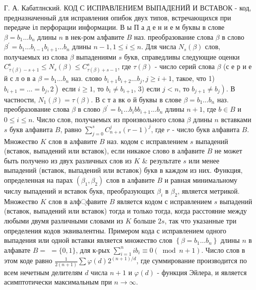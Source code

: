 \documentclass[10pt]{article}
\begin{document}
Г. А. Кабатлнский. КОД С ИСПРАВЛЕНИЕМ ВЫПАДЕНИЙ И ВСТАВОК - код, предназначенный для исправления опибок двух типов, встречающихся при передаче іл перфорации информации. В ы П а д е н и е м буквы в слове $\beta=b_{1} \ldots b_{n}$ длины $n$ в нек-ром алфавите $B$ наз. преобразование слова $\beta$ в слово $\beta^{\prime}=b_{1} \ldots b_{i-1} b_{i+1} \ldots b_{n}$ длины $n-1,1 \leqslant i \leqslant n$. Для числа $N_{s}(\beta)$ слов, получаемых из слова $\beta$ выпадениями $s$ букв, справедливы следующие оценки $C_{\tau(\beta)-s+1}^{\mathrm{s}} \leqslant N_{s}(\beta) \leqslant C_{\tau(\beta)+s-1}^{s}$, где $\tau(\beta)$ - число серий слова $\beta$ (с е р и е й с л о в а $\beta=b_{1} \ldots b_{n}$ наз. слово $b_{i+1} b_{i+2} \ldots b_{j}, j \geqslant i+1$, такое, что 1) $\left.b_{i+1}=\ldots=b_{j}, 2\right)$ если $i \geqslant 1$, то $b_{i} \neq b_{i+1}$, 3) если $j<n$, то $\left.b_{j+1} \neq b_{j}\right)$. В частности, $N_{1}(\beta)=\tau(\beta)$. В с т а вк о й буквы в слове $\beta=b_{1} \ldots b_{n}$ наз. преобразование слова $\beta$ в слово $\beta^{\prime}=b_{1} \ldots b_{i} b b_{i+1} \ldots b_{n}$ длины $n+1$, где $b \in B$ и $0 \leqslant i \leqslant n$. Число слов, получаемых из произвольного слова $\beta$ длины $n$ вставками $s$ букв алфавита $B$, равно $\sum_{j=0}^{s} C_{n+s}^{j}(r-1)^{j}$, где $r$ - число букв алфавита $B$. Множество $K$ слов в алфавите $B$ наз. кодом с исправлением $s$ выпадений (вставок, выпадений или вставок), если никакое слово в алфавите $B$ не может быть получено из двух различных слов из $K$ \& результате $s$ или менее выпадений (вставок, выпадений или вставок) букв в каждом из них. Функция, определенная на парах $\left(\beta_{1}, \beta_{2}\right)$ слов в алфавите $B$ и равная минимальному числу выпадений и вставок букв, преобразующих $\beta_{i}$ в $\beta_{2}$, является метрикой. Множество $K$ слов в алф্фавите $B$ является кодом с исправлением $s$ выпадений (вставок, выпадений или вставок) тогда и только тогда, когда расстояние между любыми двумя различными словами из $K$ больше $2 s$, так что указанные три определения кодов эквивалентны. Примером кода с исправлением одного выпадения или одной вставки является множество слов $\left\{\beta=b_{1} \ldots b_{n}\right\}$ длины $n$ в алфавате $B=$ $=\{0,1\}$, для к-рых $\sum_{i=1}^{n} i b_{i} \equiv 0(\bmod n+1)$. Число слов в этом коде равно $\frac{1}{2(n+1)} \sum \varphi(d) 2^{(n+1) / d}$, где суммирование производится по всем нечетным делителям $d$ числа $n+1$ и $\varphi(d)$ - функция Эйлера, и является асимптотически максимальным при $n \rightarrow \infty$.
\end{document}
